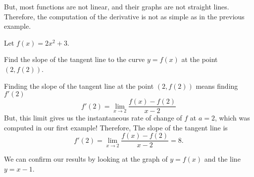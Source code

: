 \documentclass{ximera}
\begin{document}
But, most functions are not linear, and  their graphs are not  straight lines.  Therefore, the computation of the derivative is not as simple as in the previous example.

\begin{example}
	Let $f(x) = 2x^2+3$.
	
	 Find the slope of the tangent line to the curve $y=f(x)$ at the point $(2,f(2))$.
			\begin{explanation}
			  Finding the slope of the tangent line at the point $(2,f(2))$ means finding $f'(2)$
		\[
 f'(2) = \lim_{x\to 2} \frac{f(x) - f(2)}{x-2}
  \]
But, this limit gives us the instantaneous rate of change of $f$ at $a=2$, which was computed in our first example!
Therefore,	
The slope of the tangent line is 
\[
 f'(2) = \lim_{x\to 2} \frac{f(x) - f(2)}{x-2}=8.
  \]
		 	\end{explanation}
			  \begin{onlineOnly}
  We can confirm our results by looking at the graph of $y=f(x)$ and the line $y=x-1$. 
  \begin{image}
\end{image}
  \end{onlineOnly}
			
	\end{example}
\end{document}
